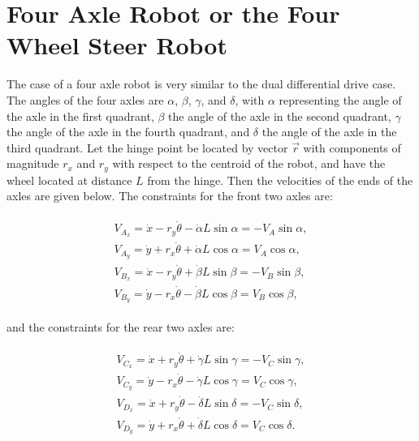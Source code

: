 \hypertarget{four-axle-robot-or-the-four-wheel-steer-robot}{%
\section{Four Axle Robot or the Four Wheel Steer
Robot}\label{four-axle-robot-or-the-four-wheel-steer-robot}}

The case of a four axle robot is very similar to the dual differential
drive case. The angles of the four axles are \(\alpha\), \(\beta\),
\(\gamma\), and \(\delta\), with \(\alpha\) representing the angle of
the axle in the first quadrant, \(\beta\) the angle of the axle in the
second quadrant, \(\gamma\) the angle of the axle in the fourth
quadrant, and \(\delta\) the angle of the axle in the third quadrant.
Let the hinge point be located by vector \(\vec{r}\) with components of
magnitude \(r_x\) and \(r_y\) with respect to the centroid of the robot,
and have the wheel located at distance \(L\) from the hinge. Then the
velocities of the ends of the axles are given below. The constraints for
the front two axles are:

\[\begin{aligned}
\begin{array}{l}
V_{A_x} =\dot{x}-r_y\dot{\theta}-\dot{\alpha}L\sin\alpha = -V_A\sin\alpha, \\[4mm]
V_{A_y} = \dot{y}+r_x\dot{\theta}+\dot{\alpha}L\cos\alpha = V_A\cos\alpha , \\[4mm]
V_{B_x} =\dot{x}-r_y\dot{\theta}+\dot{\beta}L\sin\beta = -V_B\sin\beta, \\[4mm]
V_{B_y} = \dot{y}-r_x\dot{\theta}-\dot{\beta}L\cos\beta = V_B\cos\beta , \end{array}
\end{aligned}\]

and the constraints for the rear two axles are:

\[\begin{aligned}
\begin{array}{l}
V_{C_x} =\dot{x}+r_y\dot{\theta}+\dot{\gamma}L\sin\gamma = -V_C\sin\gamma, \\[4mm]
V_{C_y} = \dot{y}-r_x\dot{\theta}-\dot{\gamma}L\cos\gamma= V_C\cos\gamma , \\[4mm]
V_{D_x} =\dot{x}+r_y\dot{\theta}-\dot{\delta}L\sin\delta = -V_C\sin\delta, \\[4mm]
V_{D_y} = \dot{y}+r_x\dot{\theta}+\dot{\delta}L\cos\delta= V_C\cos\delta  . \end{array}
\end{aligned}\]

